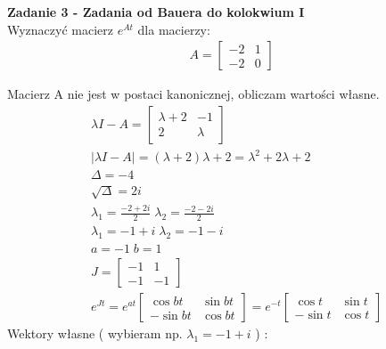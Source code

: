 \documentclass[a4paper,11pt]{article}
\begin{document}
\newpage
\begin{framed}
\textbf{Zadanie 3 - Zadania od Bauera do kolokwium I } \\ 
Wyznaczyć macierz \( e^{At} \) dla macierzy:
\begin{align*}
A = 
\begin{bmatrix}
-2 & 1 \\
-2 & 0
\end{bmatrix}
\end{align*}
\end{framed}
Macierz A nie jest w postaci kanonicznej, obliczam wartości własne.
\begin{align*}
&\lambda I - A = 
\begin{bmatrix}
\lambda+2 & -1 \\
2 & \lambda
\end{bmatrix} \\
&|\lambda I - A |= (\lambda +2)\lambda+2=\lambda ^{2}+2\lambda + 2 \\
& \Delta = -4 \\
& \sqrt{\Delta} = 2i \\
& \lambda _1 = \frac{-2+2i}{2} \; \lambda _2 = \frac{-2-2i}{2} \\
& \lambda _1 = -1 + i \; \lambda _2 = - 1-i \\
& a = -1 \; b = 1 \\
& J = 
\begin{bmatrix}
-1 & 1 \\
-1 & -1
\end{bmatrix} \\
&e^{Jt}=
e^{at}
\begin{bmatrix}
\cos bt & \sin bt \\
-\sin bt & \cos bt
\end{bmatrix}
=
e^{-t}
\begin{bmatrix}
\cos t & \sin t \\
-\sin t & \cos t
\end{bmatrix}
\end{align*}
Wektory własne ( wybieram np. \( \lambda _{1} = -1+i \) ) : 
\end{document}

